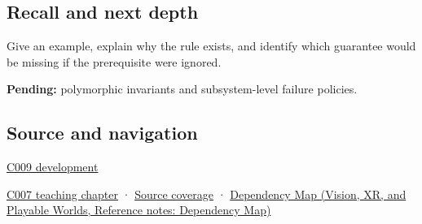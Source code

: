 \subsection{Recall and next depth}\label{appendix-8e5214819615-recall-and-next-depth}

Give an example, explain why the rule exists, and identify which guarantee would be missing if the prerequisite were ignored.

\textbf{Pending:} polymorphic invariants and subsystem-level failure policies.

\subsection{Source and navigation}\label{appendix-8e5214819615-source-and-navigation}

\hyperref[appendix-fd090d982a15-m009---parts-127-147]{C009 development}

\hyperref[01-foundations-i-ch003-public-records-and-protected-invariants]{C007 teaching chapter} · \hyperref[appendix-fd090d982a15-m007---parts-101-112]{Source coverage} · \href{../07-Vision-XR-and-Playable-Worlds/main.pdf\#nameddest=appendix-4ad47bdd269a}{Dependency Map (Vision, XR, and Playable Worlds, Reference notes: Dependency Map)}
